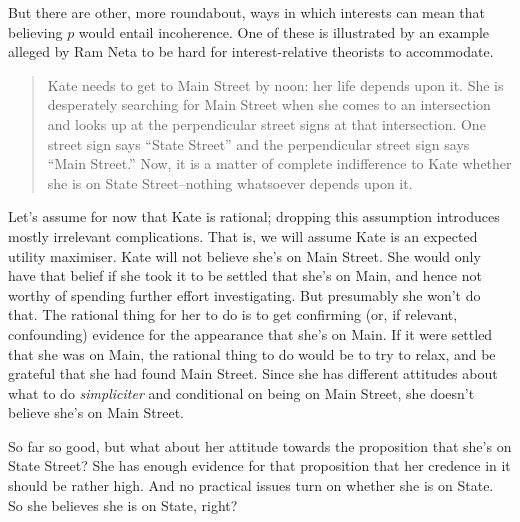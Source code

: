 \documentclass[oneside]{book}
\begin{document}
But there are other, more roundabout, ways in which interests can mean that believing $p$ would entail incoherence. One of these is illustrated by an example alleged by Ram Neta to be hard for interest-relative theorists to accommodate.

\begin{quote}
Kate needs to get to Main Street by noon: her life depends upon it. She is desperately searching for Main Street when she comes to an intersection and looks up at the perpendicular street signs at that intersection. One street sign says ``State Street'' and the perpendicular street sign says ``Main Street.'' Now, it is a matter of complete indifference to Kate whether she is on State Street--nothing whatsoever depends upon it. \citep[182]{Neta2007}
\end{quote}

\noindent Let's assume for now that Kate is rational; dropping this assumption introduces mostly irrelevant complications. That is, we will assume Kate is an expected utility maximiser. Kate will not believe she's on Main Street. She would only have that belief if she took it to be settled that she's on Main, and hence not worthy of spending further effort investigating. But presumably she won't do that. The rational thing for her to do is to get confirming (or, if relevant, confounding) evidence for the appearance that she's on Main. If it were settled that she was on Main, the rational thing to do would be to try to relax, and be grateful that she had found Main Street. Since she has different attitudes about what to do \textit{simpliciter} and conditional on being on Main Street, she doesn't believe she's on Main Street.

So far so good, but what about her attitude towards the proposition that she's on State Street? She has enough evidence for that proposition that her credence in it should be rather high. And no practical issues turn on whether she is on State. So she believes she is on State, right?
\end{document}
